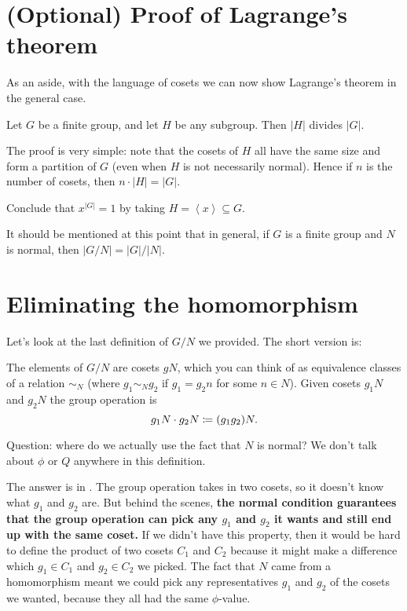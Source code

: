 \section{(Optional) Proof of Lagrange's theorem}
As an aside, with the language of cosets
we can now show Lagrange's theorem in the general case.
\begin{theorem}
	\label{thm:lagrange_grp}
	Let $G$ be a finite group, and let $H$ be any subgroup.
	Then $\left\lvert H \right\rvert$ divides $\left\lvert G \right\rvert$.
\end{theorem}

The proof is very simple: note that the cosets of $H$
all have the same size and form a partition of $G$
(even when $H$ is not necessarily normal).
Hence if $n$ is the number of cosets,
then $n \cdot \left\lvert H \right\rvert = \left\lvert G \right\rvert$.

\begin{ques}
	Conclude that $x^{\left\lvert G \right\rvert}=1$
	by taking $H = \left<x\right> \subseteq G$.
\end{ques}

\begin{remark}
	It should be mentioned at this point that
	in general, if $G$ is a finite group and $N$ is normal,
	then $|G/N| = |G| / |N|$.
\end{remark}

\section{Eliminating the homomorphism}
Let's look at the last definition of $G/N$ we provided.
The short version is:
\begin{itemize}
	\ii The elements of $G/N$ are cosets $gN$, which you can think
	of as equivalence classes of a relation $\sim_N$
	(where $g_1 \sim_N g_2$ if $g_1 = g_2n$ for some $n \in N$).
	\ii Given cosets $g_1N$ and $g_2N$ the group operation is 
	\[ g_1N \cdot g_2N \coloneqq (g_1g_2)N. \]
\end{itemize}
Question: where do we actually use the fact that $N$ is normal?
We don't talk about $\phi$ or $Q$ anywhere in this definition.

The answer is in .
The group operation takes in two cosets,
so it doesn't know what $g_1$ and $g_2$ are.
But behind the scenes,
\textbf{the normal condition guarantees that the group operation can pick
any $g_1$ and $g_2$ it wants and still end up with the same coset.}
If we didn't have this property, then it would be hard to define the
product of two cosets $C_1$ and $C_2$ because it might make a difference
which $g_1 \in C_1$ and $g_2 \in C_2$ we picked.
The fact that $N$ came from a homomorphism meant we could pick any representatives
$g_1$ and $g_2$ of the cosets we wanted, because they all had the same $\phi$-value.

